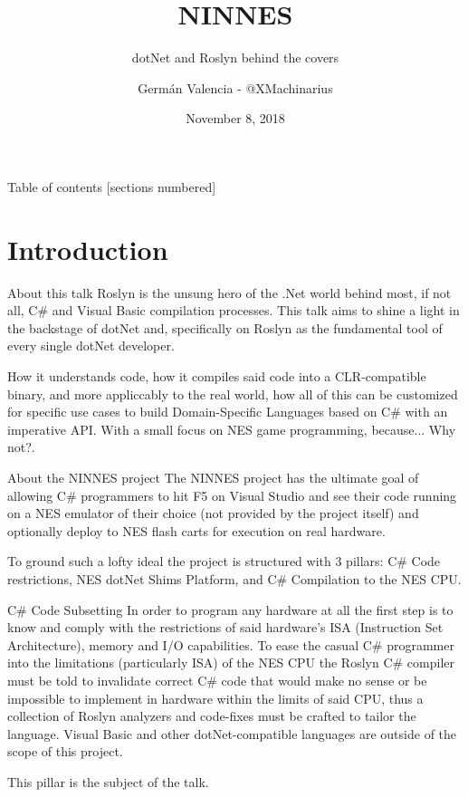 \documentclass[10pt]{beamer}
\title{NINNES}
\subtitle{dotNet and Roslyn behind the covers}
\date{November 8, 2018}
\author{Germán Valencia - @XMachinarius}
\institute{Growth Acceleration Partners}
\begin{document}
\maketitle

\begin{frame}{Table of contents}
  [sections numbered]
  \tableofcontents[hideallsubsections]
\end{frame}

\section{Introduction}
\begin{frame}{About this talk}
Roslyn is the unsung hero of the .Net world behind most, if not all, C\# and Visual Basic compilation processes. This talk aims to shine a light in the backstage of dotNet and, specifically on Roslyn as the fundamental tool of every single dotNet developer. 

How it understands code, how it compiles said code into a CLR-compatible binary, and more appliccably to the real world, how all of this can be customized for specific use cases to build Domain-Specific Languages based on C\# with an imperative API. With a small focus on NES game programming, because... Why not?.
\end{frame}

\begin{frame}{About the NINNES project}
The NINNES project has the ultimate goal of allowing C\# programmers to hit F5 on Visual Studio and see their code running on a NES emulator of their choice (not provided by the project itself) and optionally deploy to NES flash carts for execution on real hardware.

To ground such a lofty ideal the project is structured with 3 pillars: C\# Code restrictions, NES dotNet Shims Platform, and C\# Compilation to the NES CPU.
\end{frame}

\begin{frame}{C\# Code Subsetting}
In order to program any hardware at all the first step is to know and comply with the restrictions of said hardware's ISA (Instruction Set Architecture), memory and I/O capabilities. To ease the casual C\# programmer into the limitations (particularly ISA) of the NES CPU the Roslyn C\# compiler must be told to invalidate correct C\# code that would make no sense or be impossible to implement in hardware within the limits of said CPU, thus a collection of Roslyn analyzers and code-fixes must be crafted to tailor the language. Visual Basic and other dotNet-compatible languages are outside of the scope of this project.

This pillar is the subject of the talk.
\end{frame}
\end{document}
